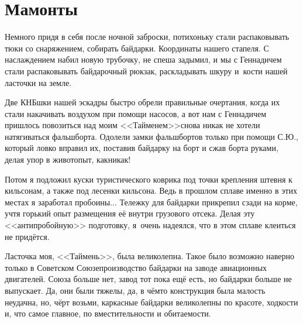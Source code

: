 \chapter{Мамонты} 
\vepsianrose

Немного придя в себя после ночной заброски, потихоньку стали распаковывать тюки со снаряжением, собирать байдарки. Координаты нашего стапеля\mdash \CoordsGorunSixteenStapel. С наслаждением  набил новую трубочку, не спеша задымил, и мы с Геннадичем стали распаковывать байдарочный рюкзак, раскладывать шкуру и~кости нашей ласточки на земле. 

Две КНБ\sdash шки нашей эскадры быстро обрели правильные очертания, когда их стали накачивать воздухом при помощи насосов, а вот нам с Геннадичем пришлось повозиться над моим <<Тайменем>>\mdash снова никак не хотели натягиваться фальшборта. Одолели замки фальшбортов только при помощи С.Ю., который ловко вправил их, поставив байдарку на борт и сжав борта руками, делая упор в живот\mdash опыт, как\sdash никак! 

\newpage
Потом я подложил куски туристического коврика под точки крепления штевня к кильсонам, а также под лесенки кильсона. Ведь в прошлом сплаве именно в этих местах я заработал пробоины$\ldots$ Тележку для байдарки прикрепил сзади на корме, учтя горький опыт размещения её внутри грузового отсека. Делая эту <<антипробойную>> подготовку, я~очень надеялся, что в этом сплаве клеиться не придётся. 

Ласточка моя, <<Таймень>>, была великолепна. Такое было возможно наверно только в Советском Союзе\mdash производство байдарки на заводе авиационных двигателей. Союза больше нет, завод тот пока ещё есть, но байдарки больше не выпускает. Да, они были тяжелы, да, в чём\sdash то конструкция была малость неудачна, но, чёрт возьми, каркасные байдарки великолепны по красоте, ходкости и, что самое главное, по вместительности и обитаемости.

